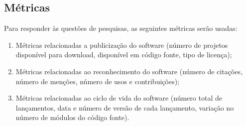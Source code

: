 

\subsection{Métricas}

Para responder às questões de pesquisas, as seguintes métricas serão usadas:

\begin{enumerate}
  \item Métricas relacionadas a publicização do software (número de projetos
  disponível para download, disponível em código fonte, tipo de licença);

  \item Métricas relacionadas ao reconhecimento do software (número de
  citações, número de menções, número de usos e contribuições);

  \item Métricas relacionadas ao ciclo de vida do software (número total de
  lançamentos, data e número de versão de cada lançamento, variação no número
  de módulos do código fonte).
\end{enumerate}

